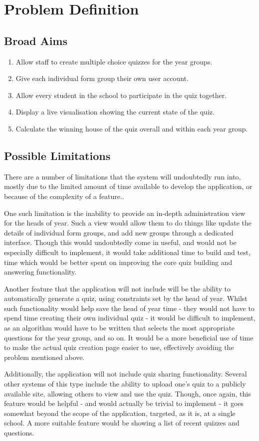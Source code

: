 \section{Problem Definition}

\subsection{Broad Aims} %
\label{sub:broad_aims}
\begin{enumerate}
	\item Allow staff to create multiple choice quizzes for the year groups.
	\item Give each individual form group their own user account.
	\item Allow every student in the school to participate in the quiz together.
	\item Display a live visualisation showing the current state of the quiz.
	\item Calculate the winning house of the quiz overall and within each year group.
\end{enumerate}

\subsection{Possible Limitations} %
\label{sub:possible_limitations}
There are a number of limitations that the system will undoubtedly run into, mostly due to the limited amount of time available to develop the application, or because of the complexity of a feature..

One such limitation is the inability to provide an in-depth administration view for the heads of year. Such a view would allow them to do things like update the details of individual form groups, and add new groups through a dedicated interface. Though this would undoubtedly come in useful, and would not be especially difficult to implement, it would take additional time to build and test, time which would be better spent on improving the core quiz building and answering functionality.

Another feature that the application will not include will be the ability to automatically generate a quiz, using constraints set by the head of year. Whilst such functionality would help save the head of year time - they would not have to spend time creating their own individual quiz - it would be difficult to implement, as an algorithm would have to be written that selects the most appropriate questions for the year group, and so on. It would be a more beneficial use of time to make the actual quiz creation page easier to use, effectively avoiding the problem mentioned above.

Additionally, the application will not include quiz sharing functionality. Several other systems of this type include the ability to upload one's quiz to a publicly available site, allowing others to view and use the quiz. Though, once again, this feature would be helpful - and would actually be trivial to implement - it goes somewhat beyond the scope of the application, targeted, as it is, at a single school. A more suitable feature would be showing a list of recent quizzes and questions.
